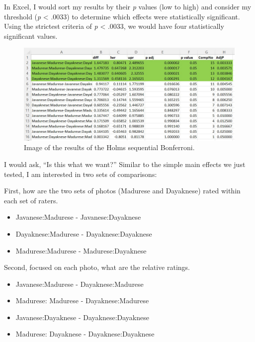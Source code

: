 \documentclass[
  11pt,
]{book}
\newenvironment{Shaded}{\begin{snugshade}}{\end{snugshade}}
\newcommand{\FunctionTok}[1]{\textcolor[rgb]{0.00,0.00,0.00}{#1}}
\newcommand{\NormalTok}[1]{#1}
\newcommand{\SpecialCharTok}[1]{\textcolor[rgb]{0.00,0.00,0.00}{#1}}
\newcommand{\StringTok}[1]{\textcolor[rgb]{0.31,0.60,0.02}{#1}}
\providecommand{\tightlist}{%
  \setlength{\itemsep}{0pt}\setlength{\parskip}{0pt}}
\begin{document}
\begin{Shaded}
\end{Shaded}

In Excel, I would sort my results by their \emph{p} values (low to high) and consider my threshold (\emph{p} \textless{} .0033) to determine which effects were statistically significant. Using the strictest criteria of \emph{p} \textless{} .0033, we would have four statistically significant values.

\begin{figure}
\centering
\includegraphics{images/factorial/Holmsequential.jpg}
\caption{Image of the results of the Holms sequential Bonferroni.}
\end{figure}

I would ask, ``Is this what we want?'' Similar to the simple main effects we just tested, I am interested in two sets of comparisons:

First, how are the two sets of photos (Madurese and Dayaknese) rated within each set of raters.

\begin{itemize}
\tightlist
\item
  Javanese:Madurese - Javanese:Dayaknese
\item
  Dayaknese:Madurese - Dayaknese:Dayaknese
\item
  Madurese:Madurese - Madurese:Dayaknese
\end{itemize}

Second, focused on each photo, what are the relative ratings.

\begin{itemize}
\tightlist
\item
  Javanese:Madurese - Dayaknese:Madurese
\item
  Madurese: Madurese - Dayaknese:Madurese
\item
  Javanese:Dayaknese - Dayaknese:Dayaknese
\item
  Madurese: Dayaknese - Dayaknese:Dayaknese
\end{itemize}
\end{document}
